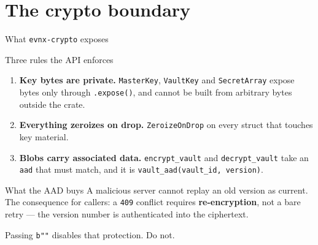 \documentclass[aspectratio=169,10pt]{beamer}
\begin{document}
\section{The crypto boundary}

\begin{frame}[fragile]{What \texttt{evnx-crypto} exposes}
\end{frame}

\begin{frame}{Three rules the API enforces}
  \begin{enumerate}
    \item \textbf{Key bytes are private.} \texttt{MasterKey}, \texttt{VaultKey}
          and \texttt{SecretArray} expose bytes only through \texttt{.expose()},
          and cannot be built from arbitrary bytes outside the crate.
    \item \textbf{Everything zeroizes on drop.} \texttt{ZeroizeOnDrop} on every
          struct that touches key material.
    \item \textbf{Blobs carry associated data.} \texttt{encrypt\_vault} and
          \texttt{decrypt\_vault} take an \texttt{aad} that must match, and it is
          \texttt{vault\_aad(vault\_id, version)}.
  \end{enumerate}

  \vspace{0.6em}
  \begin{block}{What the AAD buys}
    A malicious server cannot replay an old version as current. The consequence
    for callers: a \texttt{409} conflict requires \textbf{re-encryption}, not a
    bare retry --- the version number is authenticated into the ciphertext.
  \end{block}

  \vspace{0.3em}
  {\footnotesize Passing \texttt{b""} disables that protection. Do not.}
\end{frame}
\end{document}

